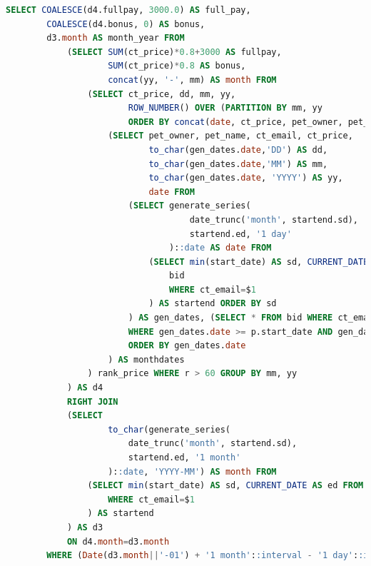 \documentclass[
  paper=a4,
  ,captions=tableheading
]{scrartcl}
\begin{document}
\begin{lstlisting}[language=SQL]
SELECT COALESCE(d4.fullpay, 3000.0) AS full_pay, 
        COALESCE(d4.bonus, 0) AS bonus, 
        d3.month AS month_year FROM
            (SELECT SUM(ct_price)*0.8+3000 AS fullpay, 
                    SUM(ct_price)*0.8 AS bonus, 
                    concat(yy, '-', mm) AS month FROM
                (SELECT ct_price, dd, mm, yy, 
                        ROW_NUMBER() OVER (PARTITION BY mm, yy 
                        ORDER BY concat(date, ct_price, pet_owner, pet_name, ct_email) ASC) AS r FROM
                    (SELECT pet_owner, pet_name, ct_email, ct_price,
                            to_char(gen_dates.date,'DD') AS dd, 
                            to_char(gen_dates.date,'MM') AS mm, 
                            to_char(gen_dates.date, 'YYYY') AS yy,
                            date FROM
                        (SELECT generate_series(
                                    date_trunc('month', startend.sd),
                                    startend.ed, '1 day'
                                )::date AS date FROM
                            (SELECT min(start_date) AS sd, CURRENT_DATE as ed FROM
                                bid 
                                WHERE ct_email=$1 
                            ) AS startend ORDER BY sd
                        ) AS gen_dates, (SELECT * FROM bid WHERE ct_email=$1) AS p
                        WHERE gen_dates.date >= p.start_date AND gen_dates.date <= p.end_date 
                        ORDER BY gen_dates.date
                    ) AS monthdates
                ) rank_price WHERE r > 60 GROUP BY mm, yy
            ) AS d4
            RIGHT JOIN 
            (SELECT                                                                              
                    to_char(generate_series(
                        date_trunc('month', startend.sd),
                        startend.ed, '1 month'
                    )::date, 'YYYY-MM') AS month FROM
                (SELECT min(start_date) AS sd, CURRENT_DATE AS ed FROM bid 
                    WHERE ct_email=$1
                ) AS startend
            ) AS d3
            ON d4.month=d3.month
        WHERE (Date(d3.month||'-01') + '1 month'::interval - '1 day'::interval) <= CURRENT_DATE
\end{lstlisting}
\end{document}
